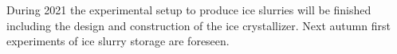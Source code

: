 \documentclass[english]{SFOEYearlyReportEnglish_2018}
\begin{document}
During 2021 the experimental setup to produce ice slurries will be finished including the design and construction of the ice crystallizer. Next autumn first experiments of ice slurry storage are foreseen.


%


%

\end{document}
